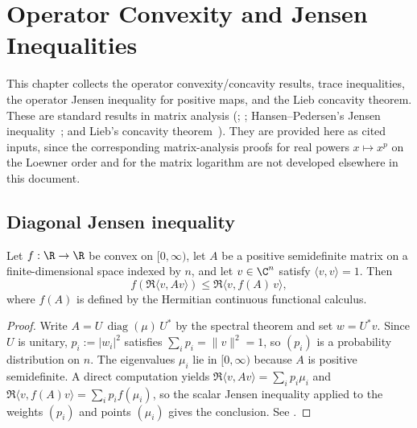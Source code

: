 \chapter{Operator Convexity and Jensen Inequalities}\label{ch:operator_convexity}

This chapter collects the operator convexity/concavity results, trace
inequalities, the operator Jensen inequality for positive maps, and the
Lieb concavity theorem. These are standard results in matrix analysis
(\cite[Chapter~V]{Bhatia1997Matrix}; \cite[Theorems~5.12 and~5.13]{Wolf2012Quantum};
Hansen--Pedersen's Jensen inequality~\cite{HansenPedersen1982Jensen};
and Lieb's concavity theorem~\cite{Lieb1973Convex}). They are
provided here as cited inputs, since the corresponding matrix-analysis proofs for
real powers $x\mapsto x^p$ on the Loewner order and for the matrix logarithm
are not developed elsewhere in this document.

\section{Diagonal Jensen inequality}

\begin{lemma}\label{lem:diagonal_jensen_of_convexOn}
    \leanok
    Let $f:\R\to\R$ be convex on $[0,\infty)$, let $A$ be a positive
    semidefinite matrix on a finite-dimensional space indexed by $n$, and let $v\in\C^n$
    satisfy $\langle v,v\rangle=1$. Then
    \[
        f\!(\Re\langle v, A v\rangle)
        \le
        \Re\langle v, f(A)\,v\rangle,
    \]
    where $f(A)$ is defined by the Hermitian continuous functional calculus.
\end{lemma}

\begin{proof}\leanok
    Write $A=U\,\operatorname{diag}(\mu)\,U^{\ast}$ by the spectral
    theorem and set $w=U^{\ast}v$. Since $U$ is unitary,
    $p_i:=\lvert w_i\rvert^2$ satisfies $\sum_i p_i=\lVert v\rVert^2=1$,
    so $(p_i)$ is a probability distribution on $n$. The eigenvalues
    $\mu_i$ lie in $[0,\infty)$ because $A$ is positive semidefinite.
    A direct computation yields
    $\Re\langle v,Av\rangle=\sum_i p_i\mu_i$ and
    $\Re\langle v,f(A)v\rangle=\sum_i p_i f(\mu_i)$, so the scalar Jensen
    inequality applied to the weights $(p_i)$ and points $(\mu_i)$ gives
    the conclusion. See \cite[Chapter~V]{Bhatia1997Matrix}.
\end{proof}

